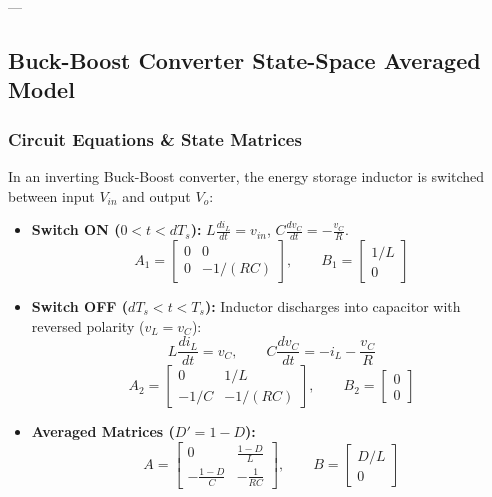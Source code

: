---

\subsection{Buck-Boost Converter State-Space Averaged Model}

\subsubsection{Circuit Equations \& State Matrices}
In an inverting Buck-Boost converter, the energy storage inductor is switched between input $V_{in}$ and output $V_o$:
\begin{itemize}
  \item \textbf{Switch ON ($0 < t < d T_s$):} $L \frac{di_L}{dt} = v_{in}$, $C \frac{dv_C}{dt} = -\frac{v_C}{R}$.
  \begin{equation}
  A_1 = \begin{bmatrix} 0 & 0 \\ 0 & -1/(RC) \end{bmatrix}, \qquad B_1 = \begin{bmatrix} 1/L \\ 0 \end{bmatrix}
  \end{equation}
  \item \textbf{Switch OFF ($d T_s < t < T_s$):} Inductor discharges into capacitor with reversed polarity ($v_L = v_C$):
  \begin{equation}
  L \frac{di_L}{dt} = v_C, \qquad C \frac{dv_C}{dt} = -i_L - \frac{v_C}{R}
  \end{equation}
  \begin{equation}
  A_2 = \begin{bmatrix} 0 & 1/L \\ -1/C & -1/(RC) \end{bmatrix}, \qquad B_2 = \begin{bmatrix} 0 \\ 0 \end{bmatrix}
  \end{equation}
  \item \textbf{Averaged Matrices ($D' = 1 - D$):}
  \begin{equation}
  A = \begin{bmatrix} 0 & \frac{1-D}{L} \\ -\frac{1-D}{C} & -\frac{1}{RC} \end{bmatrix}, \qquad B = \begin{bmatrix} D/L \\ 0 \end{bmatrix}

\end{equation}
\end{itemize}
